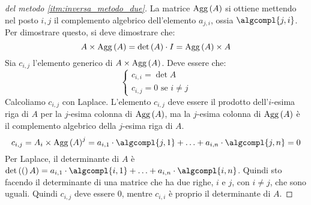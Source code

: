 \begin{proof}[del metodo \ref{itm:inversa_metodo_due}]
La matrice $\operatorname{Agg} \left( {A} \right)$ si ottiene mettendo nel posto $i,j$ il complemento algebrico dell'elemento $a_{j,i}$, ossia $\algcompl{j,i}$. Per dimostrare questo, si deve dimostrare che:
\[
A \times \operatorname{Agg} \left( {A} \right) = \operatorname{det} \left({A}\right) \cdot I = \operatorname{Agg} \left( {A} \right) \times A
\]
Sia $c_{i,j}$ l'elemento generico di $A \times \operatorname{Agg} \left( {A} \right)$. Deve essere che:
\[
\begin{cases}
c_{i,i} = \det{A} \\
c_{i,j} = 0 \text{ se } i \neq j
\end{cases}
\]
Calcoliamo $c_{i,j}$ con Laplace. L'elemento $c_{i,j}$ deve essere il prodotto dell'$i$-esima riga di $A$ per la $j$-esima colonna di $\operatorname{Agg} \left( {A} \right)$, ma la $j$-esima colonna di $\operatorname{Agg} \left( {A} \right)$ \`e il complemento algebrico della $j$-esima riga di $A$.
\[
c_{i,j} = A_i \times \agg{A}^j = 
a_{i,1} \cdot \algcompl{j,1} + \ldots + a_{i, n} \cdot \algcompl{j, n} = 0
\]
Per Laplace, il determinante di $A$ \`e $\det (A) = a_{i,1} \cdot \algcompl{i,1} + \ldots + a_{i,n} \cdot \algcompl{i,n}$. Quindi sto facendo il determinante di una matrice che ha due righe, $i$ e $j$, con $i \neq j$, che sono uguali. Quindi $c_{i,j}$ deve essere 0, mentre $c_{i,i}$ \`e proprio il determinante di $A$.
\end{proof}


